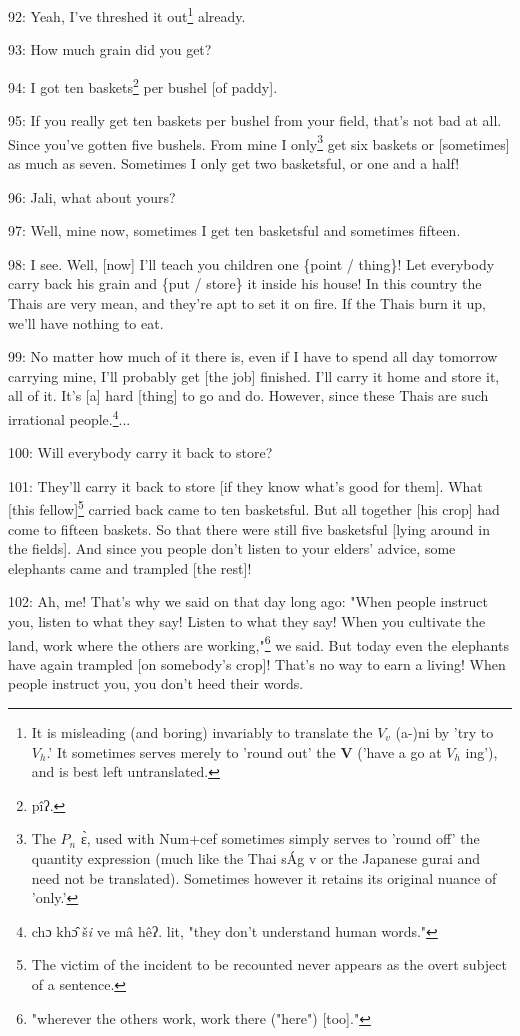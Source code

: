 92: Yeah, I've threshed it out\footnote{It is misleading (and boring) invariably to translate the $V_v$ (a-)ni by 'try to $V_h$.' It sometimes serves merely to 'round out' the \textbf{V} ('have a go at $V_h$ ing'), and is best left untranslated.} already.

93: How much grain did you get?

94: I got ten baskets\footnote{pîʔ.} per bushel [of paddy].

95: If you really get ten baskets per bushel from your field, that's not bad at
all. Since you've gotten five bushels. From mine I only\footnote{The $P_n$ ɛ̀, used with Num+cef sometimes simply serves to 'round off' the quantity expression (much like the Thai sÁg v or the Japanese gurai and need not be translated). Sometimes however it retains its original nuance of 'only.'} get six baskets or
[sometimes] as much as seven. Sometimes I only get two basketsful, or one and a
half!

96: Jali, what about yours?

97: Well, mine now, sometimes I get ten basketsful and sometimes fifteen.

98: I see. Well, [now] I'll teach you children one \{point / thing\}! Let everybody
carry back his grain and \{put / store\} it inside his house! In this country the
Thais are very mean, and they're apt to set it on fire. If the Thais burn it up,
we'll have nothing to eat.

99: No matter how much of it there is, even if I have to spend all day tomorrow
carrying mine, I'll probably get [the job] finished. I'll carry it home and store
it, all of it. It's [a] hard [thing] to go and do. However, since these Thais are
such irrational people.\footnote{chɔ khɔ̂ š\emph{i} ve mâ hêʔ. lit, "they don't understand human words."}...

100: Will everybody carry it back to store?

101: They'll carry it back to store [if they know what's good for them]. What [this
fellow]\footnote{The victim of the incident to be recounted never appears as the overt subject of a sentence.}\textbf{  }carried back came to ten basketsful. But all together [his
crop] had come to fifteen baskets. So that there were still five basketsful [lying
around in the fields]. And since you people don't listen to your elders' advice,
some elephants came and trampled [the rest]!

102: Ah, me! That's why we said on that day long ago: "When people instruct
you, listen to what they say! Listen to what they say! When you cultivate the land,
work where the others are working,"\footnote{"wherever the others work, work there ("here") [too]."} we said. But today even the elephants
have again trampled [on somebody's crop]! That's no way to earn a living! When
people instruct you, you don't heed their words.

